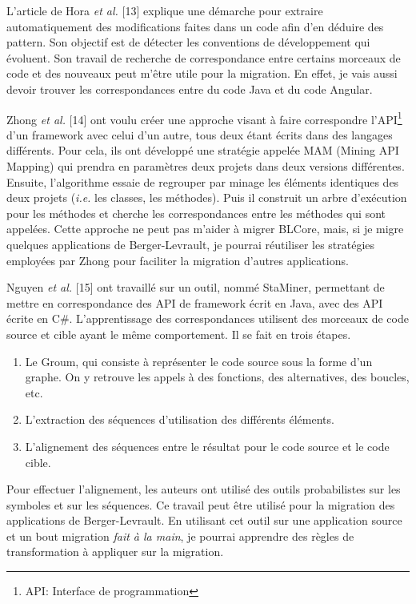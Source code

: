 \documentclass[11pt,]{article}
\providecommand{\tightlist}{%
  \setlength{\itemsep}{0pt}\setlength{\parskip}{0pt}}
\begin{document}
L'article de Hora \emph{et al.} {[}13{]} explique une démarche pour
extraire automatiquement des modifications faites dans un code afin d'en
déduire des pattern. Son objectif est de détecter les conventions de
développement qui évoluent. Son travail de recherche de correspondance
entre certains morceaux de code et des nouveaux peut m'être utile pour
la migration. En effet, je vais aussi devoir trouver les correspondances
entre du code Java et du code Angular.

Zhong \emph{et al.} {[}14{]} ont voulu créer une approche visant à faire
correspondre l'API\footnote{API: Interface de programmation} d'un
framework avec celui d'un autre, tous deux étant écrits dans des
langages différents. Pour cela, ils ont développé une stratégie appelée
MAM (Mining API Mapping) qui prendra en paramètres deux projets dans
deux versions différentes. Ensuite, l'algorithme essaie de regrouper par
minage les éléments identiques des deux projets (\emph{i.e.} les
classes, les méthodes). Puis il construit un arbre d'exécution pour les
méthodes et cherche les correspondances entre les méthodes qui sont
appelées. Cette approche ne peut pas m'aider à migrer BLCore, mais, si
je migre quelques applications de Berger-Levrault, je pourrai réutiliser
les stratégies employées par Zhong pour faciliter la migration d'autres
applications.

Nguyen \emph{et al.} {[}15{]} ont travaillé sur un outil, nommé
StaMiner, permettant de mettre en correspondance des API de framework
écrit en Java, avec des API écrite en C\#. L'apprentissage des
correspondances utilisent des morceaux de code source et cible ayant le
même comportement. Il se fait en trois étapes.

\begin{enumerate}
\def\labelenumi{\arabic{enumi}.}
\tightlist
\item
  Le Groum, qui consiste à représenter le code source sous la forme d'un
  graphe. On y retrouve les appels à des fonctions, des alternatives,
  des boucles, etc.
\item
  L'extraction des séquences d'utilisation des différents éléments.
\item
  L'alignement des séquences entre le résultat pour le code source et le
  code cible.
\end{enumerate}

Pour effectuer l'alignement, les auteurs ont utilisé des outils
probabilistes sur les symboles et sur les séquences. Ce travail peut
être utilisé pour la migration des applications de Berger-Levrault. En
utilisant cet outil sur une application source et un bout migration
\emph{fait à la main}, je pourrai apprendre des règles de transformation
à appliquer sur la migration.
\end{document}
